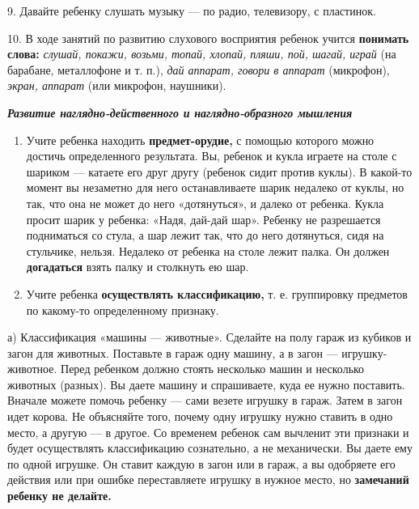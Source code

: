 \documentclass[a5paper]{book}
\renewcommand{\emph}[1]{\textit{#1}}
\begin{document}
9. Давайте ребенку слушать музыку --- по радио, телевизору, с пластинок.

10. В ходе занятий по развитию слухового восприятия ребенок учится
\textbf{понимать слова:} \emph{слушай, покажи, возьми, топай, хлопай,
пляши, пой, шагай, играй} (на барабане, металлофоне и т. п.), \emph{дай
аппарат, говори в аппарат} (микрофон), \emph{экран, аппарат} (или
микрофон, наушники).

\emph{\textbf{Развитие наглядно-действенного и наглядно-образного
мышления}}


\begin{enumerate}
\def\labelenumi{\arabic{enumi}.}
\item
  
  Учите ребенка находить \textbf{предмет-орудие,} с помощью которого
  можно достичь определенного результата. Вы, ребенок и кукла играете на
  столе с шариком --- катаете его друг другу (ребенок сидит против
  куклы). В какой-то момент вы незаметно для него останавливаете шарик
  недалеко от куклы, но так, что она не может до него «дотянуться», и
  далеко от ребенка. Кукла просит шарик у ребенка: «Надя, дай-дай шар».
  Ребенку не разрешается подниматься со стула, а шар лежит так, что до
  него дотянуться, сидя на стульчике, нельзя. Недалеко от ребенка на
  столе лежит палка. Он должен \textbf{догадаться} взять палку и
  столкнуть ею шар.
  
\item
  
  Учите ребенка \textbf{осуществлять классификацию,} т. е. группировку
  предметов по какому-то определенному признаку.
  
\end{enumerate}


а) Классификация «машины --- животные». Сделайте на полу гараж из
кубиков и загон для животных. Поставьте в гараж одну машину, а в загон
--- игрушку-животное. Перед ребенком должно стоять несколько машин и
несколько животных (разных). Вы даете машину и спрашиваете, куда ее
нужно поставить. Вначале можете помочь ребенку --- сами везете игрушку в
гараж. Затем в загон идет корова. Не объясняйте того, почему одну
игрушку нужно ставить в одно место, а другую --- в другое. Со временем
ребенок сам вычленит эти признаки и будет осуществлять классификацию
сознательно, а не механически. Вы даете ему по одной игрушке. Он ставит
каждую в загон или в гараж, а вы одобряете его действия или при ошибке
переставляете игрушку в нужное место, но \textbf{замечаний ребенку не
делайте.}
\end{document}
